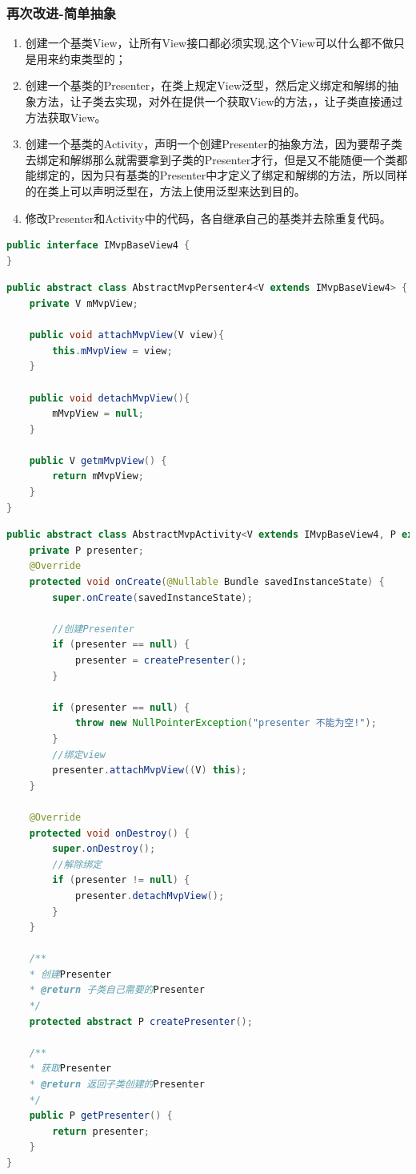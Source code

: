 \documentclass[a4paper,12pt]{ctexart}
\begin{document}
\subsubsection{再次改进-简单抽象}
\begin{enumerate}
	\item 创建一个基类View，让所有View接口都必须实现,这个View可以什么都不做只是用来约束类型的；
	\item 创建一个基类的Presenter，在类上规定View泛型，然后定义绑定和解绑的抽象方法，让子类去实现，对外在提供一个获取View的方法，，让子类直接通过方法获取View。
	\item 创建一个基类的Activity，声明一个创建Presenter的抽象方法，因为要帮子类去绑定和解绑那么就需要拿到子类的Presenter才行，但是又不能随便一个类都能绑定的，因为只有基类的Presenter中才定义了绑定和解绑的方法，所以同样的在类上可以声明泛型在，方法上使用泛型来达到目的。
	\item 修改Presenter和Activity中的代码，各自继承自己的基类并去除重复代码。
\end{enumerate}
\begin{lstlisting}[language=java]
public interface IMvpBaseView4 {
}
\end{lstlisting}
\begin{lstlisting}[language=java]
public abstract class AbstractMvpPersenter4<V extends IMvpBaseView4> {
	private V mMvpView;
	
	public void attachMvpView(V view){
		this.mMvpView = view;
	}
	
	public void detachMvpView(){
		mMvpView = null;
	}
	
	public V getmMvpView() {
		return mMvpView;
	}
}
\end{lstlisting}
\begin{lstlisting}[language=java]
public abstract class AbstractMvpActivity<V extends IMvpBaseView4, P extends AbstractMvpPersenter4<V>> extends AppCompatActivity implements IMvpBaseView4 {
	private P presenter;
	@Override
	protected void onCreate(@Nullable Bundle savedInstanceState) {
		super.onCreate(savedInstanceState);
		
		//创建Presenter
		if (presenter == null) {
			presenter = createPresenter();
		}
	
		if (presenter == null) {
			throw new NullPointerException("presenter 不能为空!");
		}
		//绑定view
		presenter.attachMvpView((V) this);
	}
	
	@Override
	protected void onDestroy() {
		super.onDestroy();
		//解除绑定
		if (presenter != null) {
			presenter.detachMvpView();
		}
	}
	
	/**
	* 创建Presenter
	* @return 子类自己需要的Presenter
	*/
	protected abstract P createPresenter();
	
	/**
	* 获取Presenter
	* @return 返回子类创建的Presenter
	*/
	public P getPresenter() {
		return presenter;
	}
}
\end{lstlisting}
\end{document}
